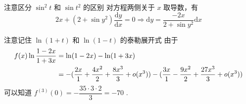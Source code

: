 \begin{answer}[660T38]{注意区分 $ \sin^2 t $ 和 $ \sin t^2 $ 的区别}
    对方程两侧关于 $ x $ 取导数，有$$
        2x + (2+\sin y^2) \dfrac{\mathrm{d}y}{\mathrm{d}x} = 0 \Rightarrow
        \mathrm{d}y = \dfrac{-2x}{2+\sin y^2}\mathrm{d}x
    $$ 
\end{answer}

\begin{answer}[660T40]{注意记住 $ \ln (1+t) $ 和 $ \ln (1-t) $ 的泰勒展开式}
    由于\begin{equation*}
        \begin{aligned}
            \displaystyle f(x) \ln \dfrac{1-2x}{1+3x} &= \ln (1-2x) - \ln (1+3x) \\&=
            -(\dfrac{2x}{1}+\dfrac{4x^2}{2}+\dfrac{8x^3}{3}+o(x^3))-
            (\dfrac{3x}{1}-\dfrac{9x^2}{2}+\dfrac{27x^3}{3}+o(x^3))
        \end{aligned}
    \end{equation*}
    可以知道 $ f^{(3)}(0) = -\dfrac{35\cdot 3\cdot 2}{3} = -70 $ .
\end{answer}

